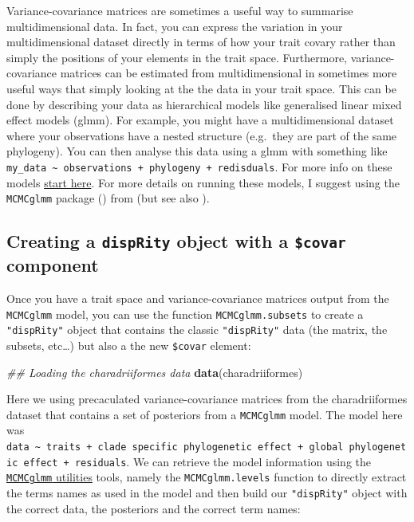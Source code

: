 \documentclass[
]{book}
\newenvironment{Shaded}{\begin{snugshade}}{\end{snugshade}}
\newcommand{\CommentTok}[1]{\textcolor[rgb]{0.56,0.35,0.01}{\textit{#1}}}
\newcommand{\KeywordTok}[1]{\textcolor[rgb]{0.13,0.29,0.53}{\textbf{#1}}}
\newcommand{\NormalTok}[1]{#1}
\begin{document}
Variance-covariance matrices are sometimes a useful way to summarise multidimensional data.
In fact, you can express the variation in your multidimensional dataset directly in terms of how your trait covary rather than simply the positions of your elements in the trait space.
Furthermore, variance-covariance matrices can be estimated from multidimensional in sometimes more useful ways that simply looking at the the data in your trait space.
This can be done by describing your data as hierarchical models like generalised linear mixed effect models (glmm).
For example, you might have a multidimensional dataset where your observations have a nested structure (e.g.~they are part of the same phylogeny).
You can then analyse this data using a glmm with something like \texttt{my\_data\ \textasciitilde{}\ observations\ +\ phylogeny\ +\ redisduals}.
For more info on these models \href{https://en.wikipedia.org/wiki/Generalized_linear_mixed_model}{start here}.
For more details on running these models, I suggest using the \texttt{MCMCglmm} package (\citet{MCMCglmm}) from \citet{hadfield2010} (but see also \citet{mulTree}).

\hypertarget{creating-a-disprity-object-with-a-covar-component}{%
\subsection{\texorpdfstring{Creating a \texttt{dispRity} object with a \texttt{\$covar} component}{Creating a dispRity object with a \$covar component}}\label{creating-a-disprity-object-with-a-covar-component}}

Once you have a trait space and variance-covariance matrices output from the \texttt{MCMCglmm} model, you can use the function \texttt{MCMCglmm.subsets} to create a \texttt{"dispRity"} object that contains the classic \texttt{"dispRity"} data (the matrix, the subsets, etc\ldots) but also a the new \texttt{\$covar} element:

\begin{Shaded}
\begin{Highlighting}[]
\CommentTok{\#\# Loading the charadriiformes data}
\KeywordTok{data}\NormalTok{(charadriiformes)}
\end{Highlighting}
\end{Shaded}

Here we using precaculated variance-covariance matrices from the charadriiformes dataset that contains a set of posteriors from a \texttt{MCMCglmm} model.
The model here was \texttt{data\ \textasciitilde{}\ traits\ +\ clade\ specific\ phylogenetic\ effect\ +\ global\ phylogenetic\ effect\ +\ residuals}.
We can retrieve the model information using the \protect\hyperlink{MCMCglmm-utilities}{\texttt{MCMCglmm} utilities} tools, namely the \texttt{MCMCglmm.levels} function to directly extract the terms names as used in the model and then build our \texttt{"dispRity"} object with the correct data, the posteriors and the correct term names:
\end{document}
